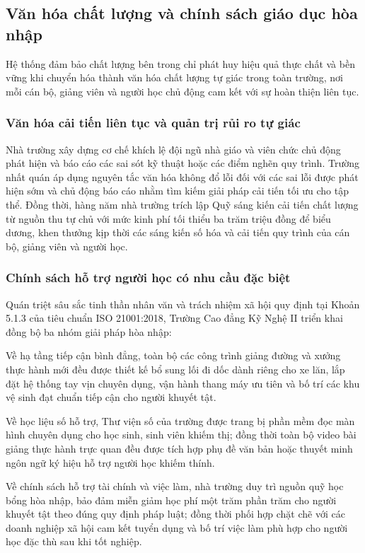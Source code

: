 \subsection{Văn hóa chất lượng và chính sách giáo dục hòa nhập}

Hệ thống đảm bảo chất lượng bên trong chỉ phát huy hiệu quả thực chất và bền vững khi chuyển hóa thành văn hóa chất lượng tự giác trong toàn trường, nơi mỗi cán bộ, giảng viên và người học chủ động cam kết với sự hoàn thiện liên tục.

\subsubsection{Văn hóa cải tiến liên tục và quản trị rủi ro tự giác}

Nhà trường xây dựng cơ chế khích lệ đội ngũ nhà giáo và viên chức chủ động phát hiện và báo cáo các sai sót kỹ thuật hoặc các điểm nghẽn quy trình. Trường nhất quán áp dụng nguyên tắc văn hóa không đổ lỗi đối với các sai lỗi được phát hiện sớm và chủ động báo cáo nhằm tìm kiếm giải pháp cải tiến tối ưu cho tập thể. Đồng thời, hàng năm nhà trường trích lập Quỹ sáng kiến cải tiến chất lượng từ nguồn thu tự chủ với mức kinh phí tối thiểu ba trăm triệu đồng để biểu dương, khen thưởng kịp thời các sáng kiến số hóa và cải tiến quy trình của cán bộ, giảng viên và người học.

\subsubsection{Chính sách hỗ trợ người học có nhu cầu đặc biệt}

Quán triệt sâu sắc tinh thần nhân văn và trách nhiệm xã hội quy định tại Khoản 5.1.3 của tiêu chuẩn ISO 21001:2018, Trường Cao đẳng Kỹ Nghệ II triển khai đồng bộ ba nhóm giải pháp hòa nhập:

Về hạ tầng tiếp cận bình đẳng, toàn bộ các công trình giảng đường và xưởng thực hành mới đều được thiết kế bổ sung lối đi dốc dành riêng cho xe lăn, lắp đặt hệ thống tay vịn chuyên dụng, vận hành thang máy ưu tiên và bố trí các khu vệ sinh đạt chuẩn tiếp cận cho người khuyết tật.

Về học liệu số hỗ trợ, Thư viện số của trường được trang bị phần mềm đọc màn hình chuyên dụng cho học sinh, sinh viên khiếm thị; đồng thời toàn bộ video bài giảng thực hành trực quan đều được tích hợp phụ đề văn bản hoặc thuyết minh ngôn ngữ ký hiệu hỗ trợ người học khiếm thính.

Về chính sách hỗ trợ tài chính và việc làm, nhà trường duy trì nguồn quỹ học bổng hòa nhập, bảo đảm miễn giảm học phí một trăm phần trăm cho người khuyết tật theo đúng quy định pháp luật; đồng thời phối hợp chặt chẽ với các doanh nghiệp xã hội cam kết tuyển dụng và bố trí việc làm phù hợp cho người học đặc thù sau khi tốt nghiệp.
